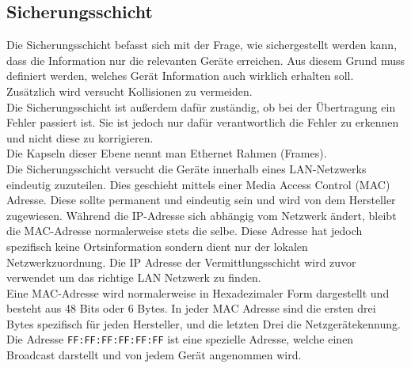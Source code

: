 \documentclass{article}
\begin{document}
	 \subsection{Sicherungsschicht}
	 Die Sicherungsschicht befasst sich mit der Frage, wie sichergestellt werden kann, dass die Information nur die relevanten Geräte erreichen. Aus diesem Grund muss definiert werden, welches Gerät Information auch wirklich erhalten soll. Zusätzlich wird versucht Kollisionen zu vermeiden. \\
	 Die Sicherungsschicht ist außerdem dafür zuständig, ob bei der Übertragung ein Fehler passiert ist. Sie ist jedoch nur dafür verantwortlich die Fehler zu erkennen und nicht diese zu korrigieren. \\
	 Die Kapseln dieser Ebene nennt man Ethernet Rahmen (Frames). \\
	 Die Sicherungsschicht versucht die Geräte innerhalb eines LAN-Netzwerks eindeutig zuzuteilen. Dies geschieht mittels einer Media Access Control (MAC) Adresse. Diese sollte permanent und eindeutig sein und wird von dem Hersteller zugewiesen. Während die IP-Adresse sich abhängig vom Netzwerk ändert, bleibt die MAC-Adresse normalerweise stets die selbe. Diese Adresse hat jedoch spezifisch keine Ortsinformation sondern dient nur der lokalen Netzwerkzuordnung. Die IP Adresse der Vermittlungsschicht wird zuvor verwendet um das richtige LAN Netzwerk zu finden. \\
	 Eine MAC-Adresse wird normalerweise in Hexadezimaler Form dargestellt und besteht aus 48 Bits oder 6 Bytes. In jeder MAC Adresse sind die ersten drei Bytes spezifisch für jeden Hersteller, und die letzten Drei die Netzgerätekennung. Die Adresse \verb|FF:FF:FF:FF:FF:FF| ist eine spezielle Adresse, welche einen Broadcast darstellt und von jedem Gerät angenommen wird. \\
\end{document}
